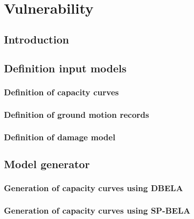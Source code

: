 \chapter{Vulnerability}
\label{chap:vulnerability}

    \section{Introduction}
    

    \section{Definition input models}
    

		\subsection{Definition of capacity curves}
		\label{subsec:cap_curves}
		

		\subsection{Definition of ground motion records}
		\label{subsec:gmrs}
		

		\subsection{Definition of damage model}
		\label{subsec:dmg_model}
		

	\section{Model generator}
	\label{sec:model-gen}
	

		\subsection{Generation of capacity curves using DBELA}
		\label{subsec:DBELA}
		

		\subsection{Generation of capacity curves using SP-BELA}
		\label{subsec:SPBELA}
		

